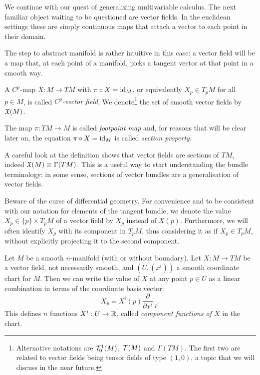 We continue with our quest of generalizing multivariable calculus.
The next familiar object waiting to be questioned are vector fields.
In the euclidean settings these are simply continuous maps that attach a vector to each point in their domain.

The step to abstract manifold is rather intuitive in this case: a vector field will be a map that, at each point of a manifold, picks a tangent vector at that point in a smooth way.

\begin{definition}\label{def:vfield}
  A $C^p$-map $X: M \to TM$ with $\pi\circ X = \operatorname{id}_M$, or equivalently $X_p\in T_pM$ for all $p\in M$, is called \emph{$C^p$-vector field}.
  We denote\footnote{Alternative notations are $\mathcal{T}_0^1(M)$, $\mathcal{T}(M)$ and $\Gamma(TM)$. The first two are related to vector fields being tensor fields of type $(1,0)$, a topic that we will discuss in the near future.} the set of smooth vector fields by $\mathfrak{X}(M)$.

  The map $\pi:TM \to M$ is called \emph{footpoint map} and, for reasons that will be clear later on, the equation $\pi\circ X = \operatorname{id}_M$ is called \emph{section property}.
\end{definition}

\begin{remark}
  A careful look at the definition shows that vector fields are sections of $TM$, indeed $\mathfrak{X}(M) \equiv \Gamma(TM)$.
  This is a useful way to start understanding the bundle terminology: in some sense, sections of vector bundles are a generalisation of vector fields.
\end{remark}

Beware of the curse of differential geometry.
For convenience and to be consistent with our notation for elements of the tangent bundle, we denote the value $X_p\in\{p\}\times T_p M$ of a vector field by $X_p$ instead of $X(p)$.
Furthermore, we will often identify $X_p$ with its component in $T_pM$, thus considering it as if $X_p\in T_pM$, without explicitly projecting it to the second component.

Let $M$ be a smooth $n$-manifold (with or without boundary).
Let $X:M\to TM$ be a vector field, not necessarily smooth, and $(U, (x^i))$ a smooth coordinate chart for $M$. Then we can write the value of $X$ at any point $p\in U$ as a linear combination in terms of the coordinate basis vector:
\begin{equation}\label{eq:vfCoordBAsis}
  X_p = X^i(p) \frac{\partial}{\partial x^i}\Big|_p.
\end{equation}
This defines $n$ functions $X^i: U\to\mathbb{R}$, called \emph{component functions of $X$} in the chart.

